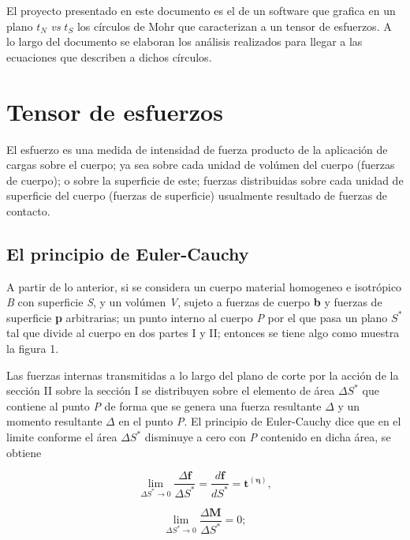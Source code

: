 \documentclass{article}
\begin{document}
    El proyecto presentado en este documento es el de un software que grafica en un plano
    ${t}_{N}$ \textit{vs} ${t}_{S}$ los círculos de Mohr que caracterizan a un tensor 
    de esfuerzos. A lo largo del documento se elaboran los análisis realizados para llegar 
    a las ecuaciones que describen a dichos círculos.

    \section{Tensor de esfuerzos}

    El esfuerzo es una medida de intensidad de fuerza producto de la aplicación de cargas
    sobre el cuerpo; ya sea sobre cada unidad de volúmen del cuerpo (fuerzas de cuerpo);
    o sobre la superficie de este; fuerzas distribuidas sobre cada unidad de superficie
    del cuerpo (fuerzas de superficie) usualmente resultado de fuerzas de contacto.

    \subsection{El principio de Euler-Cauchy}

    A partir de lo anterior, si se considera un cuerpo material homogeneo e isotrópico
    \textit{B} con superficie \textit{S}, y un volúmen \textit{V}, sujeto a fuerzas de
    cuerpo \textbf{b} y fuerzas de superficie \textbf{p} arbitrarias; un punto interno 
    al cuerpo \textit{P} por el que pasa un plano $S^{*}$ tal que divide al cuerpo
    en dos partes I y II; entonces se tiene algo como muestra la figura 1.

    Las fuerzas internas transmitidas a lo largo del plano de corte por la acción de
    la sección II sobre la sección I se distribuyen sobre el elemento de área
    $\Delta S^{*}$ que contiene al punto \textit{P} de forma que se genera una fuerza 
    resultante $\Delta$ y un momento resultante $\Delta$ en el punto 
    \textit{P}. El principio de Euler-Cauchy dice que en el limite conforme el área
    $\Delta S^{*}$ disminuye a cero con \textit{P} contenido en dicha área, se obtiene

    \begin{equation}
        \lim_{\Delta S^{*} \to 0} \frac{\Delta \bm{f}}{\Delta S^{*}} =
        \frac{d \bm{f}}{dS^{*}} =
        \bm{t^{\bm{(\eta)}}},
    \end{equation}

    \begin{equation}
        \lim_{\Delta S^{*} \to 0} \frac{\Delta \bm{M}}{\Delta S^{*}} = 0;
    \end{equation}
\end{document}
